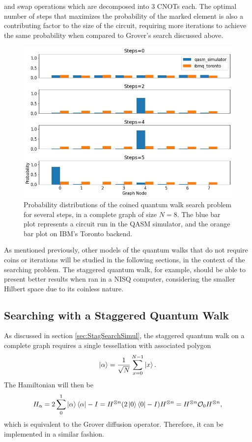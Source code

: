 \documentclass[../../dissertation.tex]{subfiles}
\begin{document}
and swap operations which are decomposed into $3$ CNOTs each. The optimal
number of steps that maximizes the probability of the marked element is also a
contributing factor to the size of the circuit, requiring more iterations to
achieve the same probability when compared to Grover's search discussed above. 
\begin{figure}[!h]
	\centering
	\includegraphics[scale=0.40]{img/Qiskit/CoinedQuantumWalk/Search/CoinedQiskitSearch_N3_M4_S0245}
	\caption{Probability distributions of the coined quantum walk search problem for several steps, in a complete graph of size $N=8$. The blue bar plot represents a circuit run in the QASM simulator, and the orange bar plot on IBM's Toronto backend.} 
	\label{fig:coinedSearchQiskitDist}
\end{figure}\par

As mentioned previously, other models of the quantum walks that do
not require coins or iterations will be studied in the following sections, in
the context of the searching problem. The staggered quantum walk, for example,
should be able to present better results when ran in a NISQ computer, considering the
smaller Hilbert space due to its coinless nature.

\subsection{Searching with a Staggered Quantum Walk}
As discussed in section \ref{sec:StagSearchSimul}, the staggered quantum walk on
a complete graph requires a single tessellation with associated polygon
\begin{equation}
	\ket{\alpha} = \frac{1}{\sqrt{N}} \sum_{x=0}^{N-1} \ket{x}.
\end{equation}
The Hamiltonian will then be 
\begin{equation}
	H_\alpha = 2\sum_0^1\ket{\alpha}\bra{\alpha} - I = H^{\otimes n} (2\ket{0}\bra{0} - I) H^{\otimes n} = H^{\otimes n} \mathcal{O}_0 H^{\otimes n},
\end{equation}
which is equivalent to the Grover diffusion operator. Therefore, it can be
implemented in a similar fashion. \par
\end{document}
